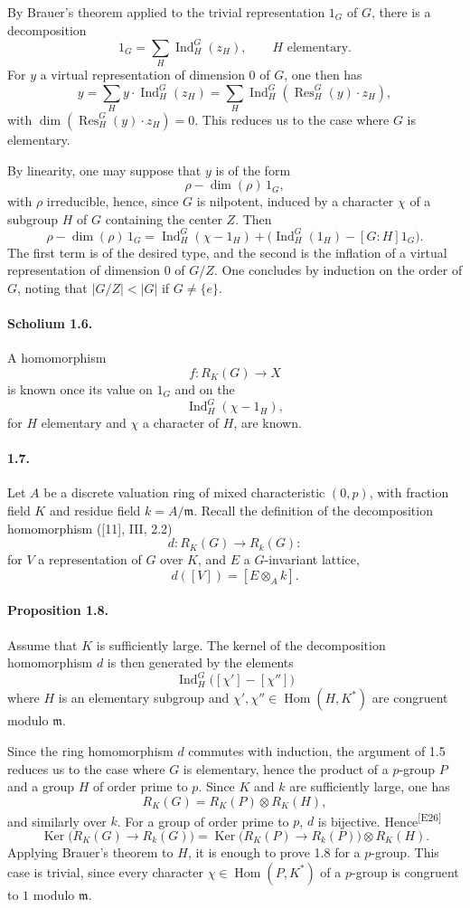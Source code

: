 \documentclass[10pt,letterpaper]{article}
\newcommand{\Hom}{\operatorname{Hom}}
\newcommand{\Ind}{\operatorname{Ind}}
\newcommand{\Res}{\operatorname{Res}}
\providecommand{\Hom}{\operatorname{Hom}}
\providecommand{\Hom}{\operatorname{Hom}}
\providecommand{\Hom}{\operatorname{Hom}}
\providecommand{\Ind}{\operatorname{Ind}}
\newcommand{\auditmark}[1]{\textsuperscript{\normalfont\scriptsize[E#1]}}
\begin{document}
By Brauer's theorem applied to the trivial representation \(1_G\) of \(G\), there is a decomposition
\[
1_G=\sum_H \Ind_H^G(z_H),
\qquad H\text{ elementary}.
\]
For \(y\) a virtual representation of dimension \(0\) of \(G\), one then has
\[
y=\sum_H y\cdot \Ind_H^G(z_H)
  =\sum_H\Ind_H^G(\Res_H^G(y)\cdot z_H),
\]
with \(\dim(\Res_H^G(y)\cdot z_H)=0\). This reduces us to the case where \(G\) is elementary.

By linearity, one may suppose that \(y\) is of the form
\[
\rho-\dim(\rho)\,1_G,
\]
with \(\rho\) irreducible, hence, since \(G\) is nilpotent, induced by a character \(\chi\) of a subgroup \(H\) of \(G\) containing the center \(Z\). Then
\[
\rho-\dim(\rho)\,1_G
=
\Ind_H^G(\chi-1_H)+\bigl(\Ind_H^G(1_H)-[G:H]1_G\bigr).
\]
The first term is of the desired type, and the second is the inflation of a virtual representation of dimension \(0\) of \(G/Z\). One concludes by induction on the order of \(G\), noting that \(|G/Z|<|G|\) if \(G\ne\{e\}\).

\paragraph{Scholium 1.6.} A homomorphism
\[
f:R_K(G)\longrightarrow X
\]
is known once its value on \(1_G\) and on the
\[
\Ind_H^G(\chi-1_H),
\]
for \(H\) elementary and \(\chi\) a character of \(H\), are known.

\paragraph{1.7.} Let \(A\) be a discrete valuation ring of mixed characteristic \((0,p)\), with fraction field \(K\) and residue field \(k=A/\mathfrak m\). Recall the definition of the decomposition homomorphism ([11], III, 2.2)
\[
d:R_K(G)\longrightarrow R_k(G):
\]
for \(V\) a representation of \(G\) over \(K\), and \(E\) a \(G\)-invariant lattice,
\[
d([V])=[E\otimes_Ak].
\]




\paragraph{Proposition 1.8.} Assume that \(K\) is sufficiently large. The kernel of the decomposition homomorphism \(d\) is then generated by the elements
\[
\Ind_H^G\bigl([\chi']-[\chi'']\bigr)
\]
where \(H\) is an elementary subgroup and \(\chi',\chi''\in\Hom(H,K^*)\) are congruent modulo \(\mathfrak m\).

Since the ring homomorphism \(d\) commutes with induction, the argument of 1.5 reduces us to the case where \(G\) is elementary, hence the product of a \(p\)-group \(P\) and a group \(H\) of order prime to \(p\). Since \(K\) and \(k\) are sufficiently large, one has
\[
R_K(G)=R_K(P)\otimes R_K(H),
\]
and similarly over \(k\). For a group of order prime to \(p\), \(d\) is bijective. Hence\auditmark{26}
\[
\operatorname{Ker}\bigl(R_K(G)\to R_k(G)\bigr)
=\operatorname{Ker}\bigl(R_K(P)\to R_k(P)\bigr)\otimes R_K(H).
\]
Applying Brauer's theorem to \(H\), it is enough to prove 1.8 for a \(p\)-group. This case is trivial, since every character \(\chi\in\Hom(P,K^*)\) of a \(p\)-group is congruent to \(1\) modulo \(\mathfrak m\).
\end{document}

